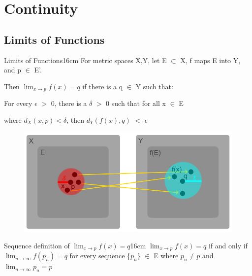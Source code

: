 \newpage

\section[Day 11: Continuity]{ Continuity }

\subsection{ Limits of Functions }

    \begin{definition}{Limits of Functions}{16cm}
        For metric spaces X,Y, let E $\subset$ X, f maps E into Y,
        and p $\in$ E'.
        
        Then $\lim_{x \rightarrow p} f(x) = q$
        if there is a q $\in$ Y such that:
        
        \begin{adjustbox}{minipage=13cm, right, vspace=0.1cm 0cm}
            For every $\epsilon$ $>$ 0, there is a $\delta$ $>$ 0
            such that for all x $\in$ E
            
            where $d_X(x,p) < \delta$, then
            $d_Y(f(x),q)$ $<$ $\epsilon$
        \end{adjustbox}
    \end{definition}



    \begin{figure}[h]
        \centering
        \includegraphics[scale=0.45]{Images/11.1.1.png}
    \end{figure}



    \begin{wtheorem}{Sequence definition of $\lim_{x \rightarrow p} f(x) = q$}{16cm}
        $\lim_{x \rightarrow p} f(x) = q$ if and only if
        $\lim_{n \rightarrow \infty} f(p_n) = q$ for every
        sequence \{$p_n$\} $\in$ E where $p_n \not = p$ and
        $\lim_{n \rightarrow \infty} p_n = p$
    \end{wtheorem}

